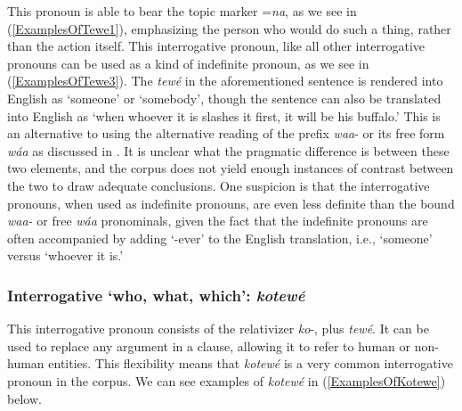 This pronoun is able to bear the topic marker =\textit{na}, as we see in (\ref{ExamplesOfTewe1}), emphasizing the person who would do such a thing, rather than the action itself. This interrogative pronoun, like all other interrogative pronouns can be used as a kind of indefinite pronoun, as we see in (\ref{ExamplesOfTewe3}). The \textit{tewé} in the aforementioned sentence is rendered into English as `someone' or `somebody', though the sentence can also be translated into English as `when whoever it is slashes it first, it will be his buffalo.' This is an alternative to using the alternative reading of the prefix \textit{waa}- or its free form \textit{wáa} as discussed in . It is unclear what the pragmatic difference is between these two elements, and the corpus does not yield enough instances of contrast between the two to draw adequate conclusions. One suspicion is that the interrogative pronouns, when used as indefinite pronouns, are even less definite than the bound \textit{waa-} or free \textit{wáa} pronominals, given the fact that the indefinite pronouns are often accompanied by adding `-ever' to the English translation, i.e., `someone' versus `whoever it is.'

\subsubsection{Interrogative `who, what, which': \textit{kotewé}}\label{SubSubSecKotewe}

This interrogative pronoun consists of the relativizer \textit{ko}-, plus \textit{tewé}. It can be used to replace any argument in a clause, allowing it to refer to human or non-human entities. This flexibility means that \textit{kotewé} is a very common interrogative pronoun in the corpus. We can see examples of \textit{kotewé} in (\ref{ExamplesOfKotewe}) below.

